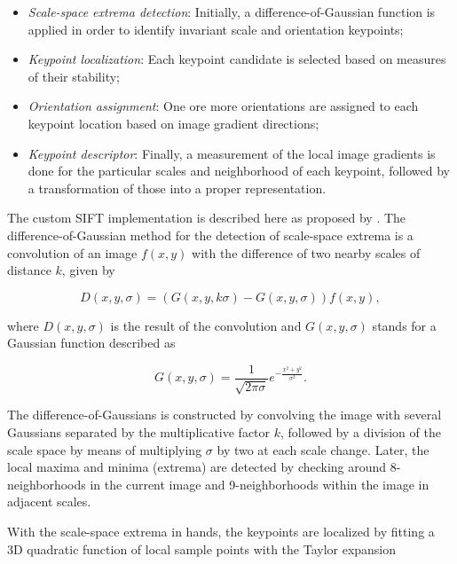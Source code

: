 \begin{itemize}
	\item \emph{Scale-space extrema detection}: Initially, a difference-of-Gaussian function is applied in order to identify invariant scale and orientation keypoints;
	
	\item \emph{Keypoint localization}: Each keypoint candidate is selected based on measures of their stability;
	
	\item \emph{Orientation assignment}: One ore more orientations are assigned to each keypoint location based on image gradient directions;
	
	\item \emph{Keypoint descriptor}: Finally, a measurement	of the local image gradients is done for the particular scales and neighborhood of each keypoint, followed by a	transformation of those into a proper representation.
	
\end{itemize}

The custom SIFT implementation is described here as proposed by . The difference-of-Gaussian method for the detection of scale-space extrema is a convolution of an image $f(x,y)$ with the difference of two nearby scales of distance $k$, given by

\begin{equation}
\label{eqn:DoG}
D(x,y,\sigma) = \left(G(x,y,k \sigma) - G(x,y,\sigma)\right) f(x,y),
\end{equation}

\noindent where $D(x,y,\sigma)$ is the result of the convolution and $G(x,y,\sigma)$ stands for a Gaussian function described as

\begin{equation}
\label{eqn:gaussian_function}
G(x,y,\sigma) = \frac{1}{\sqrt{2 \pi \sigma}} e^{- \frac{x^{2} + y^{2}}{\sigma^{2}}}.
\end{equation}

The difference-of-Gaussians is constructed by convolving the image with several Gaussians separated by the multiplicative factor $k$, followed by a division of the scale space by means of multiplying $\sigma$ by two at each scale change. Later, the local maxima and minima (extrema) are detected by checking around 8-neighborhoods in the current image and 9-neighborhoods within the image in adjacent scales.

With the scale-space extrema in hands, the keypoints are localized by fitting a 3D quadratic function of local sample points with the Taylor expansion

